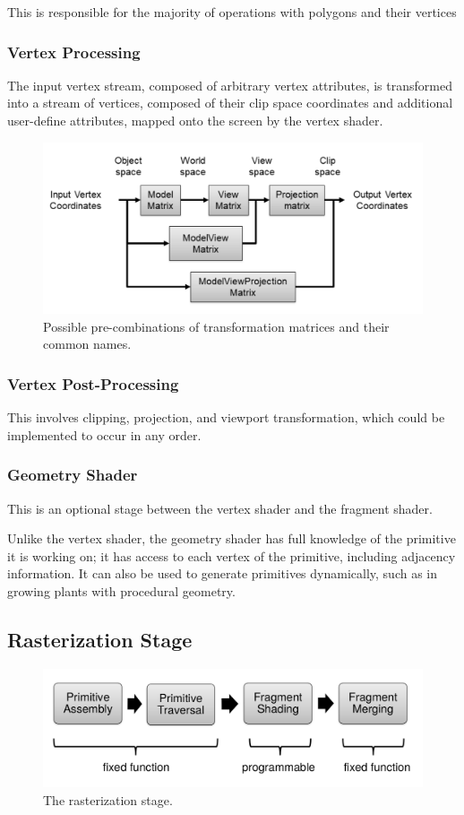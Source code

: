 \documentclass[11pt]{article}
\begin{document}
This is responsible for the majority of operations with polygons and their vertices

\subsubsection{Vertex Processing}
The input vertex stream, composed of arbitrary vertex attributes, is transformed into a stream of vertices, composed of their clip space coordinates and additional user-define attributes, mapped onto the screen by the vertex shader.

\begin{figure}[htb!]
  \centering
  \caption{Possible pre-combinations of transformation matrices and their common names.}
  \includegraphics[scale=0.3]{inputvertextooutput}
\end{figure}

\subsubsection{Vertex Post-Processing}
This involves clipping, projection, and viewport transformation, which could be implemented to occur in any order.

\subsubsection{Geometry Shader}
This is an optional stage between the vertex shader and the fragment shader.

Unlike the vertex shader, the geometry shader has full knowledge of the primitive it is working on; it has access to each vertex of the primitive, including adjacency information.
It can also be used to generate primitives dynamically, such as in growing plants with procedural geometry.

\subsection{Rasterization Stage}
\begin{figure}[htb!]
  \centering
  \caption{The rasterization stage.}
  \includegraphics[scale=0.3]{rasterizationstage}
\end{figure}
\end{document}
